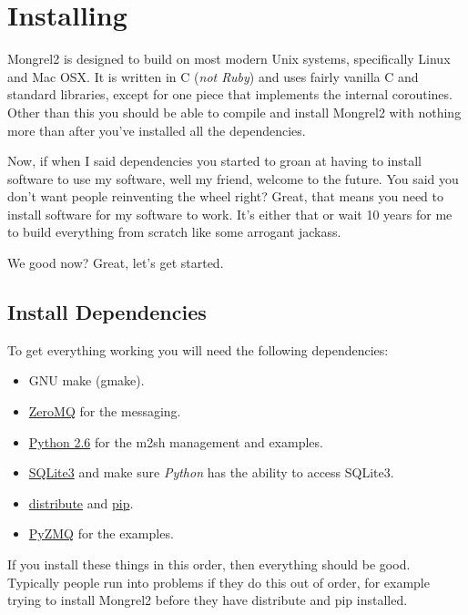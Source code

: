 \chapter{Installing}

Mongrel2 is designed to build on most modern Unix systems, specifically Linux
and Mac OSX.  It is written in C (\emph{not Ruby}) and uses fairly vanilla
C and standard libraries, except for one piece that implements the internal
coroutines.  Other than this you should be able to compile and install Mongrel2
with nothing more than  after you've installed
all the dependencies.

Now, if when I said dependencies you started to groan at having to install
software to use my software, well my friend, welcome to the future.  You
said you don't want people reinventing the wheel right?  Great, that means
you need to install software for my software to work.  It's either that or
wait 10 years for me to build everything from scratch like some arrogant
jackass.

We good now?  Great, let's get started.

\section{Install Dependencies}

To get everything working you will need the following dependencies:

\begin{itemize}
\item GNU make (gmake).
\item \href{http://zeromq.org}{ZeroMQ} for the messaging.
\item \href{http://python.org}{Python 2.6} for the m2sh management and examples.
\item \href{http://www.sqlite.org/}{SQLite3} and make sure \emph{Python} has the ability to access SQLite3.
\item \href{http://pypi.python.org/pypi/distribute}{distribute} and \href{http://pypi.python.org/pypi/pip/0.7.2}{pip}.
\item \href{http://github.com/ellisonbg/pyzmq}{PyZMQ} for the examples.
\end{itemize}

If you install these things in this order, then everything should be good.
Typically people run into problems if they do this out of order, for example
trying to install Mongrel2 before they have distribute and pip installed.

